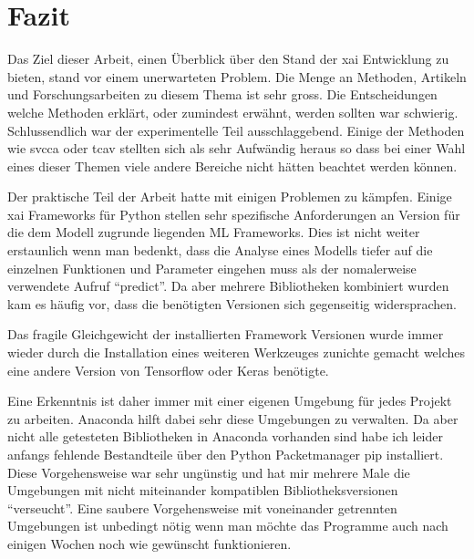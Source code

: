 \documentclass[
  12pt, %
  a4paper, %
  oneside, %
  openany, 
  numbers=noenddot, %
  BCOR=5mm, %
  parskip=half*, %
  thesis, %
]{bfhbook}
\begin{document}
\chapter{Fazit}
Das Ziel dieser Arbeit, einen Überblick über den Stand der \Gls{xai} Entwicklung zu bieten, stand vor einem unerwarteten Problem. Die Menge an Methoden, Artikeln und Forschungsarbeiten zu diesem Thema ist sehr gross. Die Entscheidungen welche Methoden erklärt, oder zumindest erwähnt, werden sollten war schwierig. Schlussendlich war der experimentelle Teil ausschlaggebend. Einige der Methoden wie \acrshort{svcca} oder \acrshort{tcav} stellten sich als sehr Aufwändig heraus so dass bei einer Wahl eines dieser Themen viele andere Bereiche nicht hätten beachtet werden können.

Der praktische Teil der Arbeit hatte mit einigen Problemen zu kämpfen. Einige \Gls{xai} Frameworks für Python stellen sehr spezifische Anforderungen an Version für die dem Modell zugrunde liegenden \Gls{ML} Frameworks. Dies ist nicht weiter erstaunlich wenn man bedenkt, dass die Analyse eines Modells tiefer auf die einzelnen Funktionen und Parameter eingehen muss als der nomalerweise verwendete Aufruf ``predict''. Da aber mehrere Bibliotheken kombiniert wurden kam es häufig vor, dass die benötigten Versionen sich gegenseitig widersprachen. 

Das fragile Gleichgewicht der installierten Framework Versionen wurde immer wieder durch die Installation eines weiteren Werkzeuges zunichte gemacht welches eine andere Version von Tensorflow oder Keras benötigte. 

Eine Erkenntnis ist daher immer mit einer eigenen Umgebung für jedes Projekt zu arbeiten. Anaconda hilft dabei sehr diese Umgebungen zu verwalten. Da aber nicht alle getesteten Bibliotheken in Anaconda vorhanden sind habe ich leider anfangs fehlende Bestandteile über den Python Packetmanager pip installiert. Diese Vorgehensweise war sehr ungünstig und hat mir mehrere Male die Umgebungen mit nicht miteinander kompatiblen Bibliotheksversionen ``verseucht''. Eine saubere Vorgehensweise mit voneinander getrennten Umgebungen ist unbedingt nötig wenn man möchte das Programme auch nach einigen Wochen noch wie gewünscht funktionieren.
\end{document}
